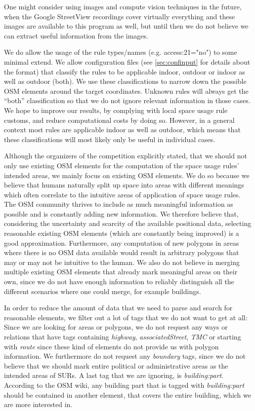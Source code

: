 \documentclass[11pt,fleqn]{book} %
\begin{document}
One might consider using images and compute vision techniques in the future, when the Google StreetView recordings cover virtually everything and these images are available to this program as well, but until then we do not believe we can extract useful information from the images.

We do allow the usage of the rule types/names (e.g. access:21="no") to some minimal extend. We allow configuration files (see \ref{sec:confinput} for details about the format) that classify the rules to be applicable indoor, outdoor or indoor as well as outdoor (both). We use these classifications to narrow down the possible OSM elements around the target coordinates. Unknown rules will always get the ``both'' classification so that we do not ignore relevant information in those cases. We hope to improve our results, by complying with local space usage rule customs, and reduce computational costs by doing so. However, in a general context most rules are applicable indoor as well as outdoor, which means that these classifications will most likely only be useful in individual cases. 

Although the organizers of the competition explicitly stated, that we should not only use existing OSM elements for the computation of the space usage rules' intended areas, we mainly focus on existing OSM elements. We do so because we believe that humans naturally split up space into areas with different meanings which often correlate to the intuitive areas of application of space usage rules. The OSM community thrives to include as much meaningful information as possible and is constantly adding new information. We therefore believe that, considering the uncertainty and scarcity of the available positional data, selecting reasonable existing OSM elements (which are constantly being improved) is a good approximation. Furthermore, any computation of new polygons in areas where there is no OSM data available would result in arbitrary polygons that may or may not be intuitive to the human. We also do not believe in merging multiple existing OSM elements that already mark meaningful areas on their own, since we do not have enough information to reliably distinguish all the different scenarios where one could merge, for example buildings.

In order to reduce the amount of data that we need to parse and search for reasonable elements, we filter out a lot of tags that we do not want to get at all: Since we are looking for areas or polygons, we do not request any ways or relations that have tags containing \textit{highway}, \textit{associatedStreet}, \textit{TMC} or starting with \textit{route} since these kind of elements do not provide us with polygon information. We furthermore do not request any \textit{boundary} tags, since we do not believe that we should mark entire political or administrative areas as the intended areas of SURs. A last tag that we are ignoring, is \textit{building:part}. According to the OSM wiki, any building part that is tagged with \textit{building:part} should be contained in another element, that covers the entire building, which we are more interested in.
\end{document}
